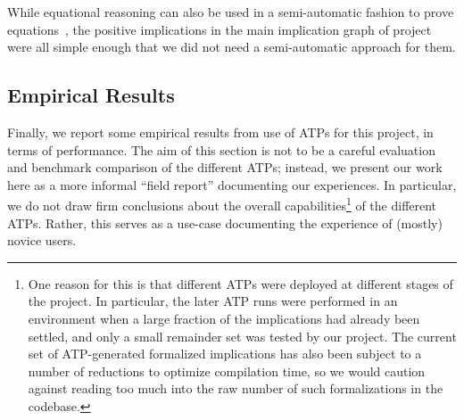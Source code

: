 
While equational reasoning can also be used in a semi-automatic fashion to prove equations~\cite{DBLP:journals/pacmpl/KoehlerGBGTS24}, the positive implications in the main implication graph of project were all simple enough that we did not need a semi-automatic approach for them.



\subsection{Empirical Results}

Finally, we report some empirical results from use of ATPs for this project, in terms of performance.
The aim of this section is not to be a careful evaluation and benchmark comparison of the different ATPs; instead, we present our work here as a more informal ``field report'' documenting our experiences.
In particular, we do not draw firm conclusions about the overall capabilities\footnote{One reason for this is that different ATPs were deployed at different stages of the project.  In particular, the later ATP runs were performed in an environment when a large fraction of the implications had already been settled, and only a small remainder set was tested by our project.  The current set of ATP-generated formalized implications has also been subject to a number of reductions to optimize compilation time, so we would caution against reading too much into the raw number of such formalizations in the codebase.} of the different ATPs.
Rather, this serves as a use-case documenting the experience of (mostly) novice users.



